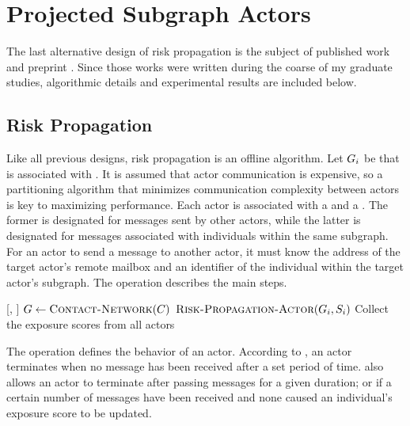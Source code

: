 \section{Projected Subgraph Actors}\label{sec:projected-subgraphs}

The last alternative design of risk propagation is the subject of published work \citep{Tatton2022b} and preprint \citep{Tatton2022a}. Since those works were written during the coarse of my graduate studies, algorithmic details and experimental results are included below.

\subsection{Risk Propagation}

Like all previous designs, risk propagation is an offline algorithm. Let $G_i$ be  that is associated with . It is assumed that actor communication is expensive, so a partitioning algorithm \citep{Buluc2016} that minimizes communication complexity between actors is key to maximizing performance. Each actor is associated with a  and a . The former is designated for messages sent by other actors, while the latter is designated for messages associated with individuals within the same subgraph. For an actor to send a message to another actor, it must know the address of the target actor's remote mailbox and an identifier of the individual within the target actor's subgraph. The \cRiskPropagationMain{} operation describes the main steps.

\begin{function}{\nRiskPropagationMain}[\vScores, \vContacts]
  \State $\vGraph \assign \Call{Contact-Network}{\vContacts}$
    \State $\cRiskPropagationActor[\vGraph_i, \vScores_i]$
  \EndFor
  \State Collect the exposure scores from all actors
\end{function}

The \cRiskPropagationActor{} operation defines the behavior of an actor. According to \citet{Tatton2022a,Tatton2022b}, an actor terminates when no message has been received after a set period of time. \citet{Tatton2022a} also allows an actor to terminate after passing messages for a given duration; or if a certain number of messages have been received and none caused an individual's exposure score to be updated.

